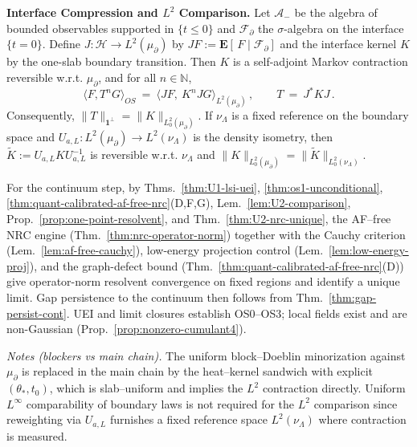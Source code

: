 \documentclass[11pt]{amsart}
\theoremstyle{plain}
\theoremstyle{definition}
\theoremstyle{remark}
\begin{document}
\vspace{10pt}
\begin{mdframed}[linewidth=0.5pt, linecolor=blue!30, backgroundcolor=blue!3, roundcorner=2pt, innertopmargin=8pt, innerbottommargin=8pt, skipabove=10pt, skipbelow=10pt]
\noindent\textbf{Interface Compression and $L^2$ Comparison.}
Let $\mathcal A_-$ be the algebra of bounded observables supported in $\{t\le 0\}$ and $\mathcal F_\partial$ the $\sigma$-algebra on the interface $\{t=0\}$. Define $J:\mathcal H\to L^2(\mu_\partial)$ by $JF:=\mathbf E[\,F\mid\mathcal F_\partial]$ and the interface kernel $K$ by the one-slab boundary transition. Then $K$ is a self-adjoint Markov contraction reversible w.r.t. $\mu_\partial$, and for all $n\in\mathbb N$,
\[
  \langle F, T^n G\rangle_{\!OS}\ =\ \langle JF,\ K^n JG\rangle_{L^2(\mu_\partial)}\,,\qquad T\ =\ J^* K J\,.
\]
Consequently, $\|T\|_{\mathbf 1^\perp}=\|K\|_{L^2_0(\mu_\partial)}$. If $\nu_\Lambda$ is a fixed reference on the boundary space and $U_{a,L}:L^2(\mu_\partial)\to L^2(\nu_\Lambda)$ is the density isometry, then $\widetilde K:=U_{a,L} K U_{a,L}^{-1}$ is reversible w.r.t. $\nu_\Lambda$ and $\|K\|_{L^2_0(\mu_\partial)}=\|\widetilde K\|_{L^2_0(\nu_\Lambda)}$.
\end{mdframed}

For the continuum step, by Thms.~\ref{thm:U1-lsi-uei}, \ref{thm:os1-unconditional}, \ref{thm:quant-calibrated-af-free-nrc}(D,F,G), Lem.~\ref{lem:U2-comparison}, Prop.~\ref{prop:one-point-resolvent}, and Thm.~\ref{thm:U2-nrc-unique}, the AF--free NRC engine (Thm.~\ref{thm:nrc-operator-norm}) together with the Cauchy criterion (Lem.~\ref{lem:af-free-cauchy}), low-energy projection control (Lem.~\ref{lem:low-energy-proj}), and the graph-defect bound (Thm.~\ref{thm:quant-calibrated-af-free-nrc}(D)) give operator-norm resolvent convergence on fixed regions and identify a unique limit. Gap persistence to the continuum then follows from Thm.~\ref{thm:gap-persist-cont}. UEI and limit closures establish OS0--OS3; local fields exist and are non-Gaussian (Prop.~\ref{prop:nonzero-cumulant4}).

\noindent\emph{Notes (blockers vs main chain).} The uniform block--Doeblin minorization against $\mu_\partial$ is replaced in the main chain by the heat--kernel sandwich with explicit $(\theta_*,t_0)$, which is slab--uniform and implies the $L^2$ contraction directly. Uniform $L^\infty$ comparability of boundary laws is not required for the $L^2$ comparison since reweighting via $U_{a,L}$ furnishes a fixed reference space $L^2(\nu_\Lambda)$ where contraction is measured.
\end{document}
